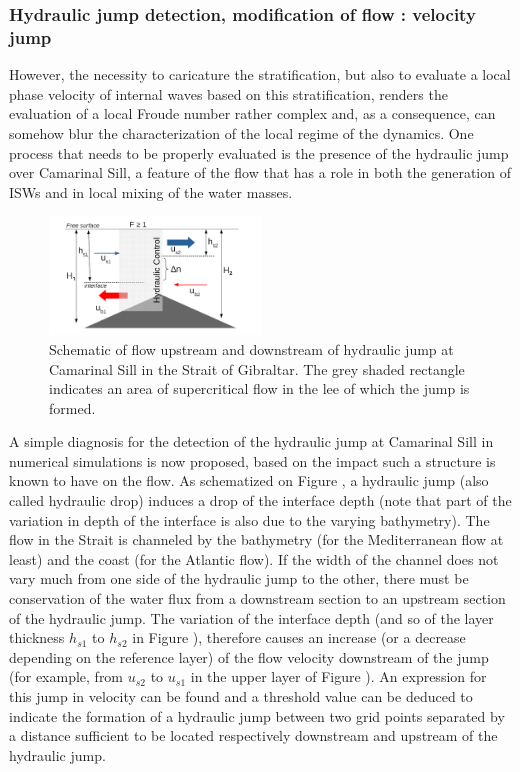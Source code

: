 \subsubsection{Hydraulic jump detection, modification of flow : velocity jump}
\label{sectiondiagJump}

However, the necessity to caricature the stratification, but also to evaluate a local phase velocity of internal waves based on this stratification, renders the evaluation of a local Froude number rather complex and, as a consequence, can somehow blur the characterization of the local regime of the dynamics. One process that needs to be properly evaluated is the presence of the hydraulic jump over Camarinal Sill, a feature of the flow that has a role in both the generation of ISWs and in local mixing of the water masses.

\begin{figure}[!h]
 \centering
 \includegraphics[width=0.5\textwidth]{./GBR3D/schema_diagressaut.png}
 \caption {Schematic of flow upstream and downstream of hydraulic jump at Camarinal Sill in the Strait of Gibraltar. The grey shaded rectangle indicates an area of supercritical flow in the lee of which the jump is formed.}
  \label{schemaRH}
\end{figure}

A simple diagnosis for the detection of the hydraulic jump at Camarinal Sill in numerical simulations is now proposed, based on the impact such a structure is known to have on the flow. 
As schematized on Figure , a hydraulic jump (also called hydraulic drop) induces a drop of the interface depth (note that part of the variation in depth of the interface is also due to the varying bathymetry). The flow in the Strait is channeled by the bathymetry (for the Mediterranean flow at least) and the coast (for the Atlantic flow). If the width of the channel does not vary much from one side of the hydraulic jump to the other, there must be conservation of the water flux from a downstream section to an upstream section of the hydraulic jump. The variation of the interface depth (and so of the layer thickness $h_{s1}$ to $h_{s2}$ in Figure ), therefore causes an increase (or a decrease depending on the reference layer) of the flow velocity downstream of the jump (for example, from $u_{s2}$ to $u_{s1}$ in the upper layer of Figure ). An expression for this jump in velocity can be found and a threshold value can be deduced to indicate the formation of a hydraulic jump between two grid points separated by a distance sufficient to be located respectively downstream and upstream of the hydraulic jump.

